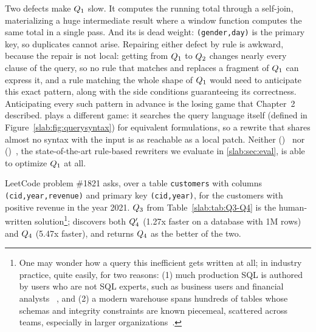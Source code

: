 Two defects make $Q_1$ slow. It computes the running total
through a self-join, materializing a huge intermediate result where a
window function computes the same total in a single pass. And its
\sqldistinctcolor is dead weight: \texttt{(gender,day)} is the
primary key, so duplicates cannot arise. Repairing either defect by
rule is awkward, because the repair is not local: getting from
$Q_1$ to $Q_2$ changes nearly every clause of the query, so
no rule that matches and replaces a fragment of $Q_1$ can express
it, and a rule matching the whole shape of $Q_1$ would need to
anticipate this exact pattern, along with the side conditions
guaranteeing its correctness. Anticipating every such pattern in
advance is the losing game that Chapter~2 described. \slabcity plays a
different game: it searches the query language itself (defined in
Figure~\ref{slab:fig:querysyntax}) for equivalent formulations, so a
rewrite that shares almost no syntax with the input is as reachable as
a local patch. Neither {\learnedrewrite} (\LR)~\cite{LR} nor
{\wetune} (\WT)~\cite{wetune}, the state-of-the-art rule-based
rewriters we evaluate in \cref{slab:sec:eval}, is able to optimize
$Q_1$ at all.




LeetCode problem \#1821 asks, over a table \texttt{customers} with
columns \texttt{(cid,year,revenue)} and primary key
\texttt{(cid,year)}, for the customers with positive revenue in the
year 2021.
$Q_3$ from Table~\ref{slab:tab:Q3-Q4} is the human-written solution\footnote{One may wonder how a query this inefficient gets written at all; in industry practice, quite easily, for two reasons: (1) much production SQL is authored by users who are not SQL experts, such as business users and financial analysts~\cite{slow-query-impact-5,slow-query-impact-7}
, and (2) a modern warehouse spans hundreds of tables whose schemas and integrity constraints are known piecemeal, scattered across teams, especially in larger organizations~\cite{arora2011schema,stein2014enterprise}.
};
\slabcity discovers both $Q'_4$ (1.27x faster on a database with
1M rows) and $Q_4$ (5.47x faster), and returns $Q_4$ as the
better of the two.

